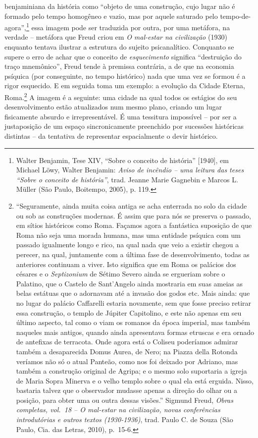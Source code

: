 benjaminiana da história como ``objeto de uma construção, cujo lugar não
é formado pelo tempo homogêneo e vazio, mas por aquele saturado pelo
tempo-de-agora'',\footnote{Walter Benjamin, Tese XIV, ``Sobre o conceito
  de história'' {[}1940{]}, em Michael Löwy, Walter Benjamin:
  \emph{Aviso de incêndio -- uma leitura das teses ``Sobre o conceito de
  história''}, trad. Jeanne Marie Gagnebin e Marcos L. Müller (São
  Paulo, Boitempo, 2005), p. 119.} essa imagem pode ser traduzida por
outra, por uma metáfora, na verdade -- metáfora que Freud criou em
\emph{O mal-estar na civilização} (1930) enquanto tentava ilustrar a
estrutura do sujeito psicanalítico. Conquanto se supere o erro de achar
que o conceito de \emph{esquecimento} significa ``destruição do traço
mnemônico'', Freud tende à premissa contrária, a de que na economia
psíquica (por conseguinte, no tempo histórico) nada que uma vez se
formou é a rigor esquecido. E em seguida toma um exemplo: a evolução da
Cidade Eterna, Roma.\footnote{``Seguramente, ainda muita coisa antiga se
  acha enterrada no solo da cidade ou sob as construções modernas. É
  assim que para nós se preserva o passado, em sítios históricos como
  Roma. Façamos agora a fantástica suposição de que Roma não seja uma
  morada humana, mas uma entidade psíquica com um passado igualmente
  longo e rico, na qual nada que veio a existir chegou a perecer, na
  qual, juntamente com a última fase de desenvolvimento, todas as
  anteriores continuam a viver. Isto significa que em Roma os palácios
  dos césares e o \emph{Septizonium} de Sétimo Severo ainda se ergueriam
  sobre o Palatino, que o Castelo de Sant'Angelo ainda mostraria em suas
  ameias as belas estátuas que o adornavam até a invasão dos godos etc.
  Mais ainda: que no lugar do palácio Caffarelli estaria novamente, sem
  que fosse preciso retirar essa construção, o templo de Júpiter
  Capitolino, e este não apenas em seu último aspecto, tal como o viam
  os romanos da época imperial, mas também naqueles mais antigos, quando
  ainda apresentava formas etruscas e era ornado de antefixas de
  terracota. Onde agora está o Coliseu poderíamos admirar também a
  desaparecida Domus Aurea, de Nero; na Piazza della Rotonda veríamos
  não só o atual Panteão, como nos foi deixado por Adriano, mas também a
  construção original de Agripa; e o mesmo solo suportaria a igreja de
  Maria Sopra Minerva e o velho templo sobre o qual ela está erguida.
  Nisso, bastaria talvez que o observador mudasse apenas a direção do
  olhar ou a posição, para obter uma ou outra dessas visões.'' Sigmund
  Freud, \emph{Obras completas, vol.~18 -- O mal-estar na civilização,
  novas conferências introdutórias e outros textos (1930-1936)}, trad.
  Paulo C. de Souza (São Paulo, Cia. das Letras, 2010), p.~15-6.} A
imagem é a seguinte: uma cidade na qual todos os estágios do seu
desenvolvimento estão atualizados num mesmo plano, criando um lugar
fisicamente absurdo e irrepresentável. É uma tessitura impossível -- por
ser a justaposição de um espaço sincronicamente preenchido por sucessões
históricas distintas -- da tentativa de representar espacialmente o
devir histórico.

